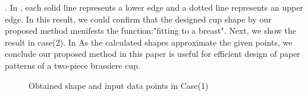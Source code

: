\documentclass[E]{scitrans}
\begin{document}
. In , each solid line represents a lower edge and a dotted line represents an upper edge. In this result, we could confirm that the designed cup shape by our proposed method menifests the function:"fitting to a breast".
Next, we show the result in case(2). In
As the calculated shapes approximate the given points, we conclude our proposed method in this paper is useful for efficient design of paper patterns of a two-piece brassiere cup.
\begin{figure}[h]
	\centering
	\hfil
	\hfil
	\caption{Obtained shape and input data points in Case(1)}
	\label{fig:ObtainedSurfaceNDS}
\end{figure}
\end{document}

